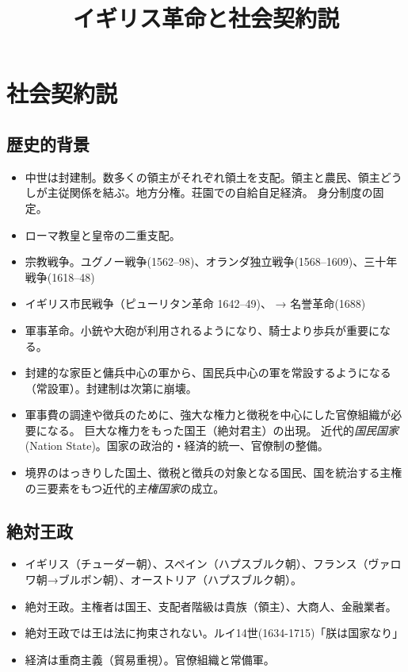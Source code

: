 \documentclass[uplatex,dvipdfmx]{jsarticle} \usepackage{mystyle}%
\title{イギリス革命と社会契約説}
\begin{document}
\maketitle
\else\chapter{社会契約説}
\fi


\label{cha:contractarian}

\section{歴史的背景}
\begin{itemize}
\item 中世は封建制。数多くの領主がそれぞれ領土を支配。領主と農民、領主どうしが主従関係を結ぶ。地方分権。荘園での自給自足経済。 身分制度の固定。
\item ローマ教皇と皇帝の二重支配。
\item 宗教戦争。ユグノー戦争(1562--98)、オランダ独立戦争(1568--1609)、三十年戦争(1618--48)
 \item イギリス市民戦争（ピューリタン革命 1642--49)、 → 名誉革命(1688)
\item 軍事革命。小銃や大砲が利用されるようになり、騎士より歩兵が重要になる。
\item 封建的な家臣と傭兵中心の軍から、国民兵中心の軍を常設するようになる（常設軍）。封建制は次第に崩壊。
\item 軍事費の調達や徴兵のために、強大な権力と徴税を中心にした官僚組織が必要になる。
巨大な権力をもった国王（絶対君主）の出現。  近代的\emph{国民国家}(Nation State)。国家の政治的・経済的統一、官僚制の整備。
\item 境界のはっきりした国土、徴税と徴兵の対象となる国民、国を統治する主権の三要素をもつ近代的\emph{主権国家}の成立。

\end{itemize}


\section{絶対王政}

\begin{itemize}
\item イギリス（チューダー朝）、スペイン（ハプスブルク朝）、フランス（ヴァロワ朝→ブルボン朝）、オーストリア（ハプスブルク朝）。

\item 絶対王政。主権者は国王、支配者階級は貴族（領主）、大商人、金融業者。
 \item 絶対王政では王は法に拘束されない。ルイ14世(1634-1715)「朕は国家なり」
\item 経済は重商主義（貿易重視）。官僚組織と常備軍。
\end{itemize}
\end{document}
